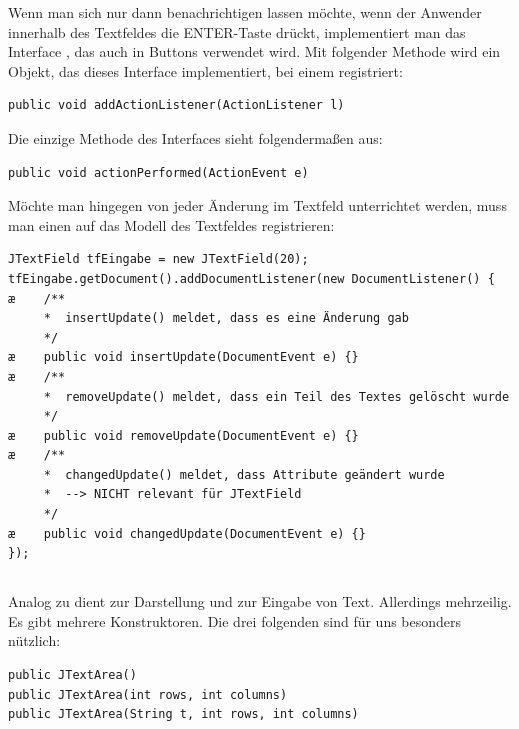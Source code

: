 \begin{compactenum}[a)]
\item Wenn man sich nur dann benachrichtigen lassen möchte, wenn der Anwender
innerhalb des Textfeldes die ENTER-Taste drückt, implementiert man das Interface
, das auch in Buttons verwendet wird. Mit folgender
Methode wird ein Objekt, das dieses Interface implementiert, bei einem
 registriert:

\begin{lstlisting}
public void addActionListener(ActionListener l)
\end{lstlisting}

Die einzige Methode des Interfaces  sieht folgendermaßen
aus:

\begin{lstlisting}
public void actionPerformed(ActionEvent e)
\end{lstlisting}

\item Möchte man hingegen von jeder Änderung im Textfeld unterrichtet werden,
muss man einen  auf das Modell des Textfeldes
registrieren:

\begin{lstlisting}
JTextField tfEingabe = new JTextField(20);
tfEingabe.getDocument().addDocumentListener(new DocumentListener() {
æ    /**
     *  insertUpdate() meldet, dass es eine Änderung gab
     */
æ    public void insertUpdate(DocumentEvent e) {}
æ    /**
     *  removeUpdate() meldet, dass ein Teil des Textes gelöscht wurde
     */
æ    public void removeUpdate(DocumentEvent e) {}
æ    /**
     *  changedUpdate() meldet, dass Attribute geändert wurde
     *  --> NICHT relevant für JTextField
     */
æ    public void changedUpdate(DocumentEvent e) {}
});
\end{lstlisting}
\end{compactenum}

\subsection{}

Analog zu  dient  zur Darstellung und zur
Eingabe von Text. Allerdings mehrzeilig. Es gibt mehrere Konstruktoren. Die
drei folgenden sind für uns besonders nützlich:

\begin{lstlisting}
public JTextArea()
public JTextArea(int rows, int columns)
public JTextArea(String t, int rows, int columns)
\end{lstlisting}

